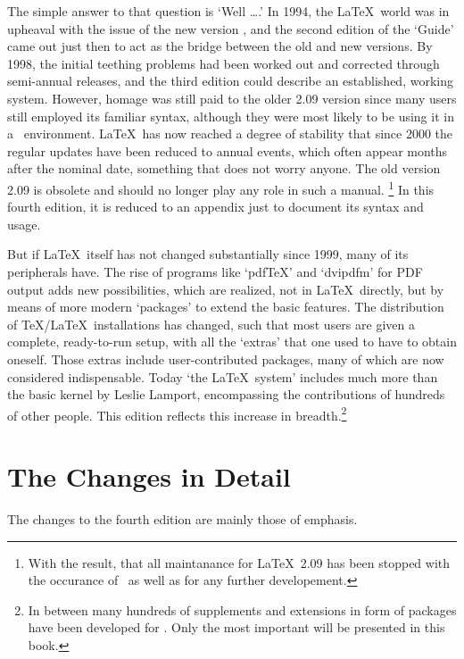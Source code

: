 \documentclass[twoside]{report}
\begin{document}
The simple answer to that question is `Well \dots.' In 1994, the \LaTeX\
world was in upheaval with the issue of the new version \LaTeXe, and the
second edition of the `Guide' came out just then to act as the bridge
between the old and new versions. By 1998, the initial teething problems had
been worked out and corrected through semi-annual releases, and the third
edition could describe an established, working system. However, homage was
still paid to the older 2.09 version since many users still employed its
familiar syntax, although they were most likely to be using it in a \LaTeXe\
environment. \LaTeX\ has now reached a degree of stability that since 2000
the regular updates have been reduced to annual events, which often appear
months after the nominal date, something that does not worry anyone. The old
version 2.09 is obsolete and should no longer play any role in such a manual.%
\footnote{With the result, that all maintanance for \LaTeX\ 2.09 has been
stopped with the occurance of \LaTeXe\ as well as for any further
developement.}
In this fourth edition, it is reduced to an appendix just to document its
syntax and usage.

But if \LaTeX\ itself has not changed substantially since 1999, many of its
peripherals have. The rise of programs like `pdf\TeX'  and `dvipdfm' for
PDF output adds new possibilities, which are realized, not in \LaTeX\
directly, but by means of more modern `packages' to extend the basic
features. The distribution of \TeX/\LaTeX\ installations has changed, such
that most users are given a complete, ready-to-run setup, with all the
`extras' that one used to have to obtain oneself. Those extras include
user-contributed packages, many of which are now considered indispensable.
Today `the \LaTeX\ system' includes much more than the basic kernel by Leslie
Lamport, encompassing the contributions of hundreds of other people. This
edition reflects this increase in breadth.\footnote{In between many hundreds
of supplements and extensions in form of packages have been developed for
\LaTeXe. Only the most important will be presented in this book.}

\section[The Changes]{The Changes in Detail}
The changes to the fourth edition are mainly those of emphasis.
\end{document}
